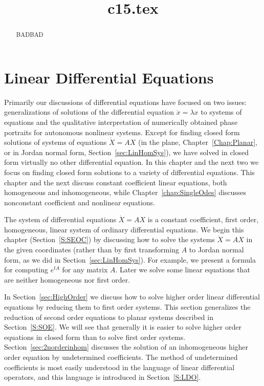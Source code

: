 \documentclass{ximera}
\title{c15.tex}
\begin{document}
\begin{abstract}
BADBAD
\end{abstract}
\maketitle

\chapter{Linear Differential Equations}
\label{C:LDE}

\normalsize

Primarily our discussions of differential equations have focused on 
two issues: generalizations of solutions of the differential equation 
$\dot{x}=\lambda x$ to systems of equations and the qualitative 
interpretation of numerically obtained phase portraits for autonomous
nonlinear systems.   Except for finding closed form solutions of 
systems of equations $\dot{X}=AX$ (in the plane, Chapter~\ref{Chap:Planar}, 
or in Jordan normal form, Section~\ref{sec:LinHomSys}), we have solved in 
closed form virtually no other differential equation.  In this chapter and 
the next two we focus on finding closed form solutions to a variety of 
differential equations.  This chapter and the next discuss constant 
coefficient linear equations, both homogeneous and inhomogeneous, 
while Chapter~\ref{chap:SingleOdes} discusses nonconstant coefficient
and nonlinear equations.  

The system of differential equations $\dot{X}=AX$ is a constant coefficient, 
first order, homogeneous, linear system of ordinary differential equations. 
We begin this chapter (Section~\ref{S:SEOC}) by discussing how to solve 
the systems $\dot{X}=AX$ in the given coordinates (rather than by first 
transforming $A$ to Jordan normal form, as we did in 
Section~\ref{sec:LinHomSys}).  For example, we present a formula for 
computing $e^{tA}$ for any matrix $A$.  Later we solve some linear 
equations that are neither homogeneous nor first order.   

In Section~\ref{sec:HighOrder} we discuss how to solve higher order 
linear differential equations by reducing them to first order systems.  
This section generalizes the reduction of second order equations to planar
systems described in Section~\ref{S:SOE}.  We will see that generally it is 
easier to solve higher order equations in closed form than to solve first 
order systems.  Section~\ref{sec:2norderinhom} discusses the solution of an 
inhomogeneous higher order equation by undetermined coefficients.  The method 
of undetermined coefficients is most easily understood in the language of 
linear differential operators, and this language is introduced in 
Section~\ref{S:LDO}.
\end{document}
